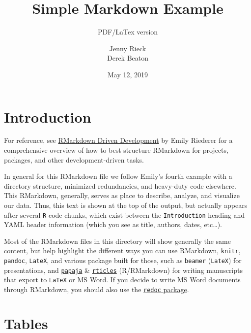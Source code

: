 \documentclass[]{article}
\title{Simple Markdown Example}
\subtitle{PDF/LaTex version}
\author{Jenny Rieck \\ Derek Beaton}
\date{May 12, 2019}
\begin{document}
\maketitle

\hypertarget{introduction}{%
\section{Introduction}\label{introduction}}

For reference, see
\href{https://emilyriederer.netlify.com/post/rmarkdown-driven-development/}{RMarkdown
Driven Development} by Emily Riederer for a comprehensive overview of
how to best structure RMarkdown for projects, packages, and other
development-driven tasks.

In general for this RMarkdown file we follow Emily's fourth example with
a directory structure, minimized redundancies, and heavy-duty code
elsewhere. This RMarkdown, generally, serves as place to describe,
analyze, and visualize our data. Thus, this text is shown at the top of
the output, but actually appears after several \texttt{R} code chunks,
which exist between the \texttt{Introduction} heading and YAML header
information (which you see as title, authors, dates, etc\ldots{}).

Most of the RMarkdown files in this directory will show generally the
same content, but help highlight the different ways you can use
RMarkdown, \texttt{knitr}, \texttt{pandoc}, \texttt{LateX}, and various
package built for those, such as \texttt{beamer} (\texttt{LateX}) for
presentations, and
\href{https://github.com/crsh/papaja}{\texttt{papaja}} \&
\href{https://github.com/rstudio/rticles}{\texttt{rticles}}
(R/RMarkdown) for writing manuscripts that export to \texttt{LaTeX} or
MS Word. If you decide to write MS Word documents through RMarkdown, you
should also use the
\href{https://github.com/noamross/redoc}{\texttt{redoc} package}.

\hypertarget{tables}{%
\section{Tables}\label{tables}}
\end{document}
